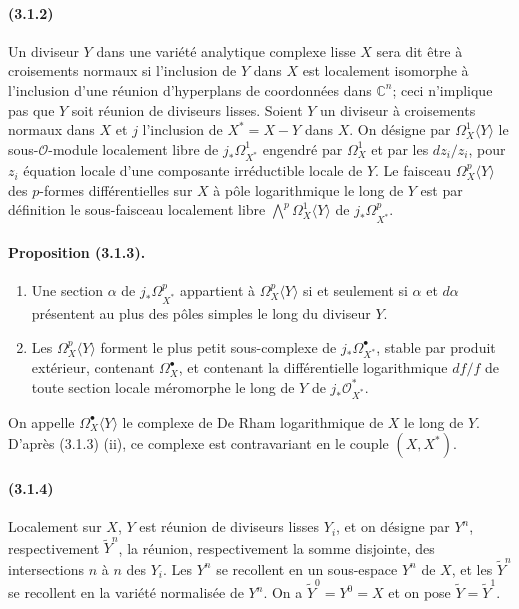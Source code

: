 \documentclass[10pt]{article}
\newcommand{\C}{\mathbb C}
\providecommand{\cO}{\mathcal O}
\providecommand{\cO}{\mathcal O}
\begin{document}
\paragraph{(3.1.2)} Un diviseur $Y$ dans une variété analytique complexe lisse $X$ sera dit être à croisements normaux si l'inclusion de $Y$ dans $X$ est localement isomorphe à l'inclusion d'une réunion d'hyperplans de coordonnées dans $\C^n$; ceci n'implique pas que $Y$ soit réunion de diviseurs lisses. Soient $Y$ un diviseur à croisements normaux dans $X$ et $j$ l'inclusion de $X^*=X-Y$ dans $X$. On désigne par $\Omega_X^1\langle Y\rangle$ le sous-$\cO$-module localement libre de $j_*\Omega_{X^*}^1$ engendré par $\Omega_X^1$ et par les $dz_i/z_i$, pour $z_i$ équation locale d'une composante irréductible locale de $Y$. Le faisceau $\Omega_X^p\langle Y\rangle$ des $p$-formes différentielles sur $X$ à pôle logarithmique le long de $Y$ est par définition le sous-faisceau localement libre $\bigwedge^p\Omega_X^1\langle Y\rangle$ de $j_*\Omega_{X^*}^p$.

\paragraph{Proposition (3.1.3).} 
\begin{enumerate}[label=(\roman*)]
\item Une section $\alpha$ de $j_*\Omega_{X^*}^p$ appartient à $\Omega_X^p\langle Y\rangle$ si et seulement si $\alpha$ et $d\alpha$ présentent au plus des pôles simples le long du diviseur $Y$.
\item Les $\Omega_X^p\langle Y\rangle$ forment le plus petit sous-complexe de $j_*\Omega_{X^*}^\bullet$, stable par produit extérieur, contenant $\Omega_X^\bullet$, et contenant la différentielle logarithmique $df/f$ de toute section locale méromorphe le long de $Y$ de $j_*\cO_{X^*}^*$.
\end{enumerate}
On appelle $\Omega_X^\bullet\langle Y\rangle$ le complexe de De Rham logarithmique de $X$ le long de $Y$. D'après (3.1.3) (ii), ce complexe est contravariant en le couple $(X,X^*)$.

\paragraph{(3.1.4)} Localement sur $X$, $Y$ est réunion de diviseurs lisses $Y_i$, et on désigne par $Y^n$, respectivement $\widetilde Y^n$, la réunion, respectivement la somme disjointe, des intersections $n$ à $n$ des $Y_i$. Les $Y^n$ se recollent en un sous-espace $Y^n$ de $X$, et les $\widetilde Y^n$ se recollent en la variété normalisée de $Y^n$. On a $\widetilde Y^0=Y^0=X$ et on pose $\widetilde Y=\widetilde Y^1$.
\end{document}
